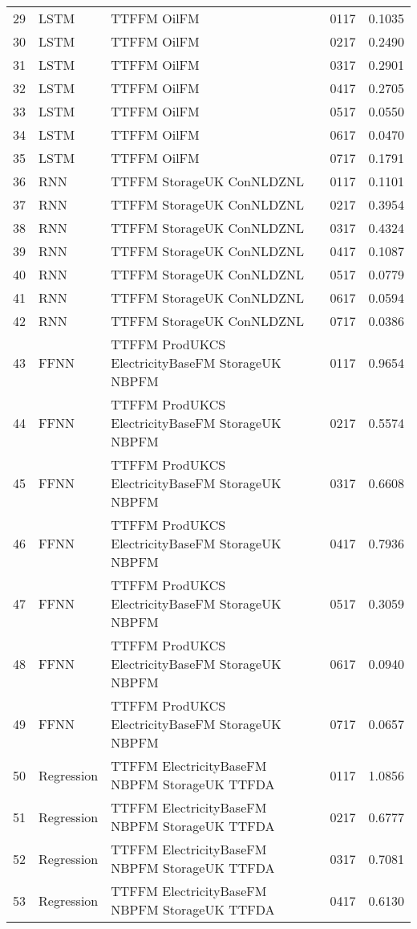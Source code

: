 \begin{table}[ht]
\begin{tabular}{rlllr}
  29 & LSTM & TTFFM OilFM & 0117 & 0.1035 \\ 
  30 & LSTM & TTFFM OilFM & 0217 & 0.2490 \\ 
  31 & LSTM & TTFFM OilFM & 0317 & 0.2901 \\ 
  32 & LSTM & TTFFM OilFM & 0417 & 0.2705 \\ 
  33 & LSTM & TTFFM OilFM & 0517 & 0.0550 \\ 
  34 & LSTM & TTFFM OilFM & 0617 & 0.0470 \\ 
  35 & LSTM & TTFFM OilFM & 0717 & 0.1791 \\ 
  36 & RNN & TTFFM StorageUK ConNLDZNL & 0117 & 0.1101 \\ 
  37 & RNN & TTFFM StorageUK ConNLDZNL & 0217 & 0.3954 \\ 
  38 & RNN & TTFFM StorageUK ConNLDZNL & 0317 & 0.4324 \\ 
  39 & RNN & TTFFM StorageUK ConNLDZNL & 0417 & 0.1087 \\ 
  40 & RNN & TTFFM StorageUK ConNLDZNL & 0517 & 0.0779 \\ 
  41 & RNN & TTFFM StorageUK ConNLDZNL & 0617 & 0.0594 \\ 
  42 & RNN & TTFFM StorageUK ConNLDZNL & 0717 & 0.0386 \\ 
  43 & FFNN & TTFFM ProdUKCS ElectricityBaseFM StorageUK NBPFM & 0117 & 0.9654 \\ 
  44 & FFNN & TTFFM ProdUKCS ElectricityBaseFM StorageUK NBPFM & 0217 & 0.5574 \\ 
  45 & FFNN & TTFFM ProdUKCS ElectricityBaseFM StorageUK NBPFM & 0317 & 0.6608 \\ 
  46 & FFNN & TTFFM ProdUKCS ElectricityBaseFM StorageUK NBPFM & 0417 & 0.7936 \\ 
  47 & FFNN & TTFFM ProdUKCS ElectricityBaseFM StorageUK NBPFM & 0517 & 0.3059 \\ 
  48 & FFNN & TTFFM ProdUKCS ElectricityBaseFM StorageUK NBPFM & 0617 & 0.0940 \\ 
  49 & FFNN & TTFFM ProdUKCS ElectricityBaseFM StorageUK NBPFM & 0717 & 0.0657 \\ 
  50 & Regression & TTFFM ElectricityBaseFM NBPFM StorageUK TTFDA & 0117 & 1.0856 \\ 
  51 & Regression & TTFFM ElectricityBaseFM NBPFM StorageUK TTFDA & 0217 & 0.6777 \\ 
  52 & Regression & TTFFM ElectricityBaseFM NBPFM StorageUK TTFDA & 0317 & 0.7081 \\ 
  53 & Regression & TTFFM ElectricityBaseFM NBPFM StorageUK TTFDA & 0417 & 0.6130 \\ 

\end{tabular}
\end{table}
